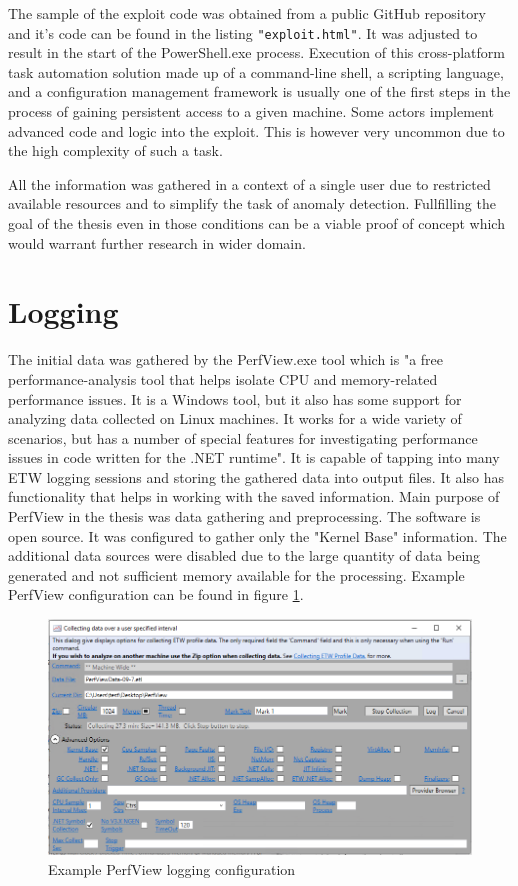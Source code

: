 \documentclass[a4paper,twoside,12pt]{book}
\begin{document}
The sample of the exploit code was obtained from a public GitHub repository 
\cite{bib:sampleExploit} and it's code can be found in the listing \lstinline|"exploit.html"|. 
It was adjusted to result in the start of the PowerShell.exe process. Execution of this 
cross-platform task automation solution made up of a command-line shell, a scripting 
language, and a configuration management framework is usually one of the first steps in 
the process of gaining persistent access to a given machine. Some actors implement advanced 
code and logic into the exploit. This is however very uncommon due to the high complexity 
of such a task.

All the information was gathered in a context of a single user due to restricted available
resources and to simplify the task of anomaly detection. Fullfilling the goal of the thesis
even in those conditions can be a viable proof of concept which would warrant further 
research in wider domain.  

\section{Logging}

The initial data was gathered by the PerfView.exe tool which is "a free performance-analysis 
tool that helps isolate CPU and memory-related performance issues. It is a Windows tool, 
but it also has some support for analyzing data collected on Linux machines. It works for 
a wide variety of scenarios, but has a number of special features for investigating 
performance issues in code written for the .NET runtime"\cite{bib:PerfView}. It is capable of 
tapping into many ETW logging sessions and storing the gathered data into output files. It also 
has functionality that helps in working with the saved information. Main purpose of PerfView 
in the thesis was data gathering and preprocessing. The software is open source.
It was configured to gather only the "Kernel Base" information. The additional data sources 
were disabled due to the large quantity of data being generated and not sufficient memory 
available for the processing. Example PerfView configuration can be found in figure 
\ref{fig:PerfViewConfig}. 

\begin{figure}
	\centering
	\includegraphics[scale=0.55]{images/perf_config}
	\caption{Example PerfView logging configuration}
	\label{fig:PerfViewConfig}
 \end{figure}
\end{document}
